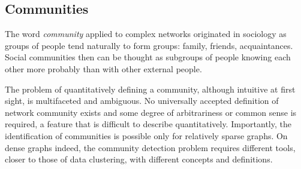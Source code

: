 \subsection{Communities}\label{sec:communities}
The word \emph{community} applied to complex networks originated in sociology as groups of people tend naturally to form groups: family, friends, acquaintances.
Social communities then can be thought as subgroups of people knowing each other more probably than with other external people.

The problem of quantitatively defining a community, although intuitive at first sight, is multifaceted and ambiguous. No universally accepted definition of network community exists and some degree of arbitrariness or common sense is required, a feature that is difficult to describe quantitatively.
Importantly, the identification of communities is possible only for relatively sparse graphs. On dense graphs indeed, the community detection problem requires different tools, closer to those of data clustering, with different concepts and definitions.

